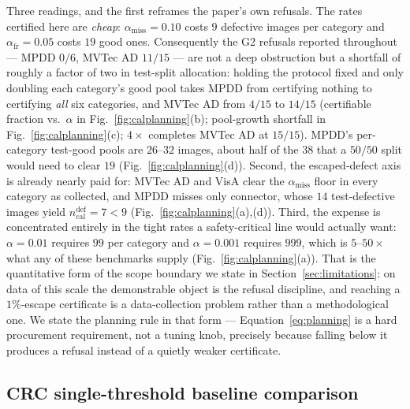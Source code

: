 \documentclass[preprint,11pt]{elsarticle}
\begin{document}
Three readings, and the first reframes the paper's own refusals. The rates certified here are
\emph{cheap}: $\alpha_{\text{miss}}=0.10$ costs $9$ defective images per category and
$\alpha_{\text{fr}}=0.05$ costs $19$ good ones. Consequently the G2 refusals reported
throughout --- MPDD $0/6$, MVTec AD $11/15$ --- are not a deep obstruction but a shortfall of
roughly a factor of two in test-split allocation: holding the protocol fixed and only doubling
each category's good pool takes MPDD from certifying nothing to certifying \emph{all} six
categories, and MVTec AD from $4/15$ to $14/15$ (certifiable fraction vs.\ $\alpha$ in
Fig.~\ref{fig:calplanning}(b); pool-growth shortfall in Fig.~\ref{fig:calplanning}(c); $4\times$
completes MVTec AD at $15/15$). MPDD's per-category test-good pools are $26$--$32$ images,
about half of the $38$ that a $50/50$ split would need to clear $19$ (Fig.~\ref{fig:calplanning}(d)). Second, the
escaped-defect axis is already nearly paid for: MVTec AD and VisA clear the $\alpha_{\text{miss}}$
floor in every category as collected, and MPDD misses only connector, whose $14$ test-defective
images yield $n_{\text{cal}}^{\text{def}}=7<9$ (Fig.~\ref{fig:calplanning}(a),(d)). Third, the expense is concentrated entirely in
the tight rates a safety-critical line would actually want: $\alpha=0.01$ requires $99$ per
category and $\alpha=0.001$ requires $999$, which is $5$--$50\times$ what any of these
benchmarks supply (Fig.~\ref{fig:calplanning}(a)). That is the quantitative form of the scope boundary we state in
Section~\ref{sec:limitations}: on data of this scale the demonstrable object is the refusal
discipline, and reaching a $1\%$-escape certificate is a data-collection problem rather than a
methodological one. We state the planning rule in that form --- Equation~\eqref{eq:planning} is a
hard procurement requirement, not a tuning knob, precisely because falling below it produces a
refusal instead of a quietly weaker certificate.

\subsection{CRC single-threshold baseline comparison}
\label{sec:crcbaseline}
\end{document}
